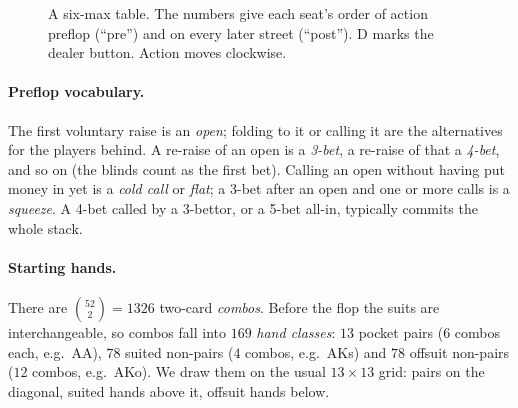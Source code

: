 \begin{figure}[t]
\centering
{}
\caption{A six-max table. The numbers give each seat's order of action preflop (\enquote{pre}) and on every later street (\enquote{post}). D marks the dealer button. Action moves clockwise.}
\label{fig:table}
\end{figure}

\paragraph{Preflop vocabulary.} The first voluntary raise is an \emph{open}; folding to it or calling it are the alternatives for the players behind. A re-raise of an open is a \emph{3-bet}, a re-raise of that a \emph{4-bet}, and so on (the blinds count as the first bet). Calling an open without having put money in yet is a \emph{cold call} or \emph{flat}; a 3-bet after an open and one or more calls is a \emph{squeeze}. A 4-bet called by a 3-bettor, or a 5-bet all-in, typically commits the whole stack.

\paragraph{Starting hands.} There are $\binom{52}{2} = 1326$ two-card \emph{combos}. Before the flop the suits are interchangeable, so combos fall into $169$ \emph{hand classes}: $13$ pocket pairs ($6$ combos each, e.g.\ AA), $78$ suited non-pairs ($4$ combos, e.g.\ AKs) and $78$ offsuit non-pairs ($12$ combos, e.g.\ AKo). We draw them on the usual $13\times 13$ grid: pairs on the diagonal, suited hands above it, offsuit hands below.

